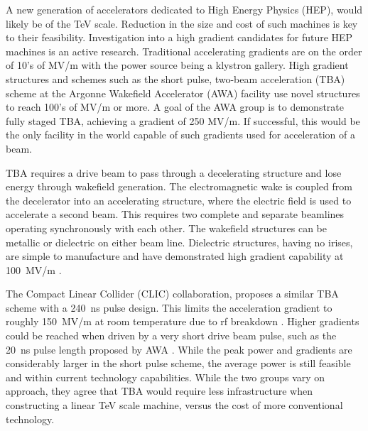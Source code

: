  \label{sec:motivation}

A new generation of accelerators dedicated to High Energy Physics
(HEP), would likely be of the TeV scale. Reduction in the size and cost
of such machines is key to their feasibility. 
Investigation into a high gradient candidates for future HEP machines is an active research. 
Traditional accelerating gradients are on the order of 10's of MV/m
with the power source being a klystron gallery.
High gradient structures and schemes such as the 
short pulse, two-beam acceleration (TBA) scheme 
at the Argonne Wakefield Accelerator (AWA) facility
use novel structures to reach 100's of MV/m or more. 
A goal of the AWA group is to demonstrate fully staged TBA, 
achieving a gradient of 250 MV/m. If successful, this would
be the only facility in the world capable of such gradients used for
acceleration of a beam.

TBA requires a drive beam to pass through a decelerating structure and
lose energy through wakefield generation. The electromagnetic wake
is coupled from the decelerator into an accelerating structure, where
the electric field is used to accelerate a second beam. 
This requires two complete and separate beamlines 
operating synchronously with each other.  
The wakefield structures can be metallic or dielectric on either beam line. 
Dielectric structures, having no irises, are simple to manufacture and have demonstrated
high gradient capability at \SI{100}{MV/m} \cite{WeiPaper}. 

The Compact Linear Collider (CLIC) collaboration, proposes a similar TBA scheme with
a \SI{240}{ns} pulse design. This limits the acceleration gradient
to roughly \SI{150}{MV/m} at room temperature due to rf breakdown \cite{CLICdesignReport}.
Higher gradients could be reached when driven by a very short drive
beam pulse, such as the \SI{20}{ns} pulse length proposed by AWA \cite{WeiPaper}. 
While the peak power and gradients are considerably larger in the short pulse scheme, 
the average power is still feasible and within current technology capabilities.
While the two groups vary on approach, they agree that TBA would 
require less infrastructure when constructing a linear TeV scale machine, 
versus the cost of more conventional technology. 

